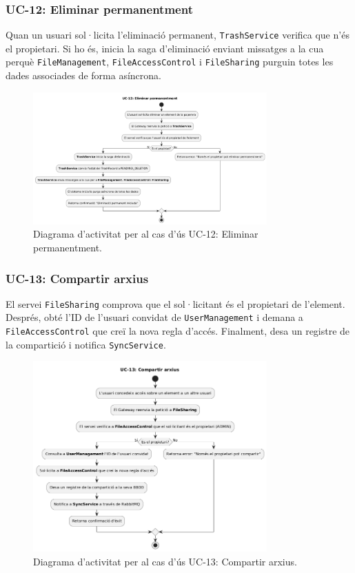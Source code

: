 \subsubsection{UC-12: Eliminar permanentment}
Quan un usuari sol·licita l'eliminació permanent, \texttt{TrashService} verifica que n'és el propietari. Si ho és, inicia la saga d'eliminació enviant missatges a la cua perquè \texttt{FileManagement}, \texttt{FileAccessControl} i \texttt{FileSharing} purguin totes les dades associades de forma asíncrona.

\begin{figure}[H]
    \centering
    \includegraphics[width=0.8\textwidth]{Figures/ad_UC12.png}
    \caption{Diagrama d'activitat per al cas d'ús UC-12: Eliminar permanentment.}
    \label{fig:ad_uc12_app}
\end{figure}

\subsubsection{UC-13: Compartir arxius}
El servei \texttt{FileSharing} comprova que el sol·licitant és el propietari de l'element. Després, obté l'ID de l'usuari convidat de \texttt{UserManagement} i demana a \texttt{FileAccessControl} que creï la nova regla d'accés. Finalment, desa un registre de la compartició i notifica \texttt{SyncService}.

\begin{figure}[H]
    \centering
    \includegraphics[width=0.8\textwidth]{Figures/ad_UC13.png}
    \caption{Diagrama d'activitat per al cas d'ús UC-13: Compartir arxius.}
    \label{fig:ad_uc13_app}
\end{figure}

